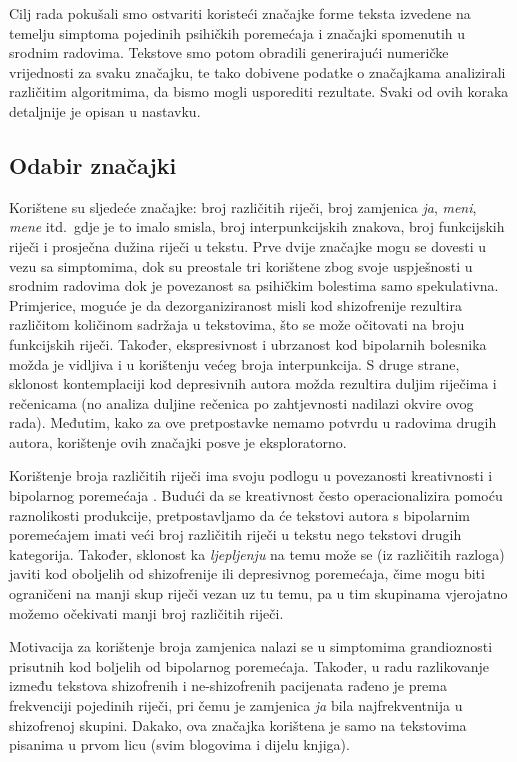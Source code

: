 \documentclass[10pt, a4paper]{article}
\begin{document}
Cilj rada pokušali smo ostvariti koristeći značajke forme teksta izvedene na temelju simptoma pojedinih psihičkih poremećaja i značajki spomenutih u srodnim radovima. Tekstove smo potom obradili generirajući numeričke vrijednosti za svaku značajku, te tako dobivene podatke o značajkama analizirali različitim algoritmima, da bismo mogli usporediti rezultate. Svaki od ovih koraka detaljnije je opisan u nastavku.

\subsection{Odabir značajki}

Korištene su sljedeće značajke: broj različitih riječi, broj zamjenica \emph{ja}, \emph{meni}, \emph{mene} itd.~gdje je to imalo smisla, broj interpunkcijskih znakova, broj funkcijskih riječi i prosječna dužina riječi u tekstu. Prve dvije značajke mogu se dovesti u vezu sa simptomima, dok su preostale tri korištene zbog svoje uspješnosti u srodnim radovima \citep{kristo} dok je povezanost sa psihičkim bolestima samo spekulativna. Primjerice, moguće je da dezorganiziranost misli kod shizofrenije rezultira različitom količinom sadržaja u tekstovima, što se može očitovati na broju funkcijskih riječi. Također, ekspresivnost i ubrzanost kod bipolarnih bolesnika možda je vidljiva i u korištenju većeg broja interpunkcija. S druge strane, sklonost kontemplaciji kod depresivnih autora možda rezultira duljim riječima i rečenicama (no analiza duljine rečenica po zahtjevnosti nadilazi okvire ovog rada). Međutim, kako za ove pretpostavke nemamo potvrdu u radovima drugih autora, korištenje ovih značajki posve je eksploratorno.

Korištenje broja različitih riječi ima svoju podlogu u povezanosti kreativnosti i bipolarnog poremećaja \citep{crea}. Budući da se kreativnost često operacionalizira pomoću raznolikosti produkcije, pretpostavljamo da će tekstovi autora s bipolarnim poremećajem imati veći broj različitih riječi u tekstu nego tekstovi drugih kategorija. Također, sklonost ka \emph{ljepljenju} na temu može se (iz različitih razloga) javiti kod oboljelih od shizofrenije ili depresivnog poremećaja, čime mogu biti ograničeni na manji skup riječi vezan uz tu temu, pa u tim skupinama vjerojatno možemo očekivati manji broj različitih riječi.

Motivacija za korištenje broja zamjenica nalazi se u simptomima grandioznosti prisutnih kod boljelih od bipolarnog poremećaja. Također, u radu \citep{strous-2009} razlikovanje između tekstova shizofrenih i ne-shizofrenih pacijenata rađeno je prema frekvenciji pojedinih riječi, pri čemu je zamjenica \emph{ja} bila najfrekventnija u shizofrenoj skupini. Dakako, ova značajka korištena je samo na tekstovima pisanima u prvom licu (svim blogovima i dijelu knjiga).
\end{document}
